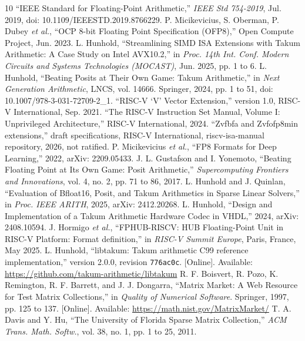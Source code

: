 \documentclass[conference]{IEEEtran}
\newcommand{\code}[1]{\texttt{#1}}
\begin{document}
\begin{thebibliography}{10}
``IEEE Standard for Floating-Point Arithmetic,'' \emph{IEEE Std 754-2019},
Jul. 2019, doi: 10.1109/IEEESTD.2019.8766229.
P. Micikevicius, S. Oberman, P. Dubey \emph{et al.}, ``OCP 8-bit Floating Point
Specification (OFP8),'' Open Compute Project, Jun. 2023.
L. Hunhold, ``Streamlining SIMD ISA Extensions with Takum Arithmetic:
A Case Study on Intel AVX10.2,'' in \emph{Proc. 14th Int. Conf. Modern Circuits
and Systems Technologies (MOCAST)}, Jun. 2025, pp. 1 to 6.
L. Hunhold, ``Beating Posits at Their Own Game: Takum Arithmetic,'' in
\emph{Next Generation Arithmetic}, LNCS, vol. 14666. Springer, 2024,
pp. 1 to 51, doi: 10.1007/978-3-031-72709-2\_1.
``RISC-V `V' Vector Extension,'' version 1.0, RISC-V International, Sep. 2021.
``The RISC-V Instruction Set Manual, Volume I: Unprivileged Architecture,''
RISC-V International, 2024.
``Zvfbfa and Zvfofp8min extensions,'' draft specifications, RISC-V
International, riscv-isa-manual repository, 2026, not ratified.
P. Micikevicius \emph{et al.}, ``FP8 Formats for Deep Learning,'' 2022,
arXiv: 2209.05433.
J. L. Gustafson and I. Yonemoto, ``Beating Floating Point at Its Own Game:
Posit Arithmetic,'' \emph{Supercomputing Frontiers and Innovations}, vol. 4,
no. 2, pp. 71 to 86, 2017.
L. Hunhold and J. Quinlan, ``Evaluation of Bfloat16, Posit, and Takum
Arithmetics in Sparse Linear Solvers,'' in \emph{Proc. IEEE ARITH}, 2025,
arXiv: 2412.20268.
L. Hunhold, ``Design and Implementation of a Takum Arithmetic Hardware Codec
in VHDL,'' 2024, arXiv: 2408.10594.
J. Hormigo \emph{et al.}, ``FPHUB-RISCV: HUB Floating-Point Unit in RISC-V
Platform: Format definition,'' in \emph{RISC-V Summit Europe}, Paris, France,
May 2025.
L. Hunhold, ``libtakum: Takum arithmetic C99 reference implementation,''
version 2.0.0, revision \code{776ac0c}.
[Online]. Available: \url{https://github.com/takum-arithmetic/libtakum}
R. F. Boisvert, R. Pozo, K. Remington, R. F. Barrett, and J. J. Dongarra,
``Matrix Market: A Web Resource for Test Matrix Collections,'' in
\emph{Quality of Numerical Software}. Springer, 1997, pp. 125 to 137.
[Online]. Available: \url{https://math.nist.gov/MatrixMarket/}
T. A. Davis and Y. Hu, ``The University of Florida Sparse Matrix Collection,''
\emph{ACM Trans. Math. Softw.}, vol. 38, no. 1, pp. 1 to 25, 2011.
\end{thebibliography}
\end{document}
